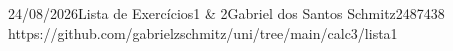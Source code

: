\documentclass{article}
\begin{document}
{24/08/2026}{Lista de Exercícios}{1 \& 2}{Gabriel dos Santos Schmitz}{2487438}
{https://github.com/gabrielzschmitz/uni/tree/main/calc3/lista1}



% 

\newpage
\printbibliography\
\end{document}
